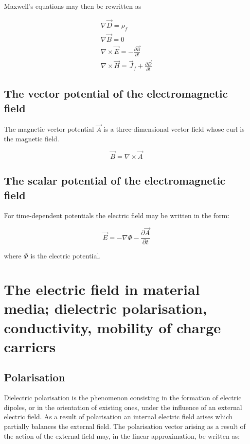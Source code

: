 Maxwell's equations may then be rewritten as

\begin{equation}
    \begin{matrix}
    \nabla \vec{D} = \rho_{f}\\
    \nabla \vec{B} = 0\\
    \nabla\times\vec{E} = -\frac{\partial \vec{B}}{\partial t}\\
    \nabla\times\vec{H} = \vec{J}_{f} + \frac{\partial\vec{D}}{\partial t}
    \end{matrix}
\end{equation}

\subsection{The vector potential of the electromagnetic field}

The magnetic vector potential $\vec{A}$ is a three-dimensional vector field whose curl is the magnetic field.

\begin{equation}
    \vec{B} = \nabla\times\vec{A}
\end{equation}

\subsection{The scalar potential of the electromagnetic field}

For time-dependent potentials the electric field may be written in the form:

\begin{equation}
    \vec{E} = -\nabla\Phi - \frac{\partial\vec{A}}{\partial t}
\end{equation}

where $\Phi$ is the electric potential.

\section{The electric field in material media; dielectric polarisation, conductivity, mobility of charge carriers}

\subsection{Polarisation}

Dielectric polarisation is the phenomenon consisting in the formation of electric dipoles, or in the orientation of existing ones, under the influence of an external electric field. As a result of polarisation an internal electric field arises which partially balances the external field. The polarisation vector arising as a result of the action of the external field may, in the linear approximation, be written as:

